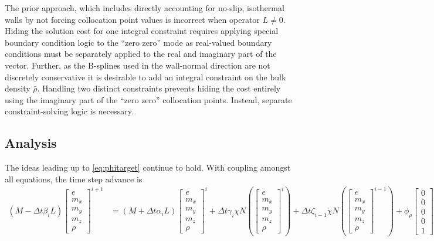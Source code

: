 \documentclass[letterpaper,11pt,nointlimits,reqno]{amsart}
\begin{document}
The prior approach, which includes directly accounting for no-slip, isothermal
walls by not forcing collocation point values is incorrect when operator $L
\neq 0$.  Hiding the solution cost for one integral constraint requires
applying special boundary condition logic to the ``zero zero'' mode as
real-valued boundary conditions must be separately applied to the real and
imaginary part of the vector.  Further, as the B-splines used in the
wall-normal direction are not discretely conservative it is desirable to add an
integral constraint on the bulk density $\bar{\rho}$.  Handling two distinct
constraints prevents hiding the cost entirely using the imaginary part of the
``zero zero'' collocation points.  Instead, separate constraint-solving logic
is necessary.

\subsection{Analysis}

The ideas leading up to \eqref{eq:phitarget} continue to hold.  With coupling
amongst all equations, the time step advance is
\begin{align}
  \left(M - \Delta{}t\beta_{i}L\right)
  \begin{bmatrix} e \\ m_x \\ m_y \\ m_z \\ \rho \end{bmatrix}^{i+1}
  &=
  \left(M + \Delta{}t\alpha_{i}L\right)
  \begin{bmatrix} e \\ m_x \\ m_y \\ m_z \\ \rho \end{bmatrix}^{i}
  + \Delta{}t\gamma_{i}\chi{}N\left(
  \begin{bmatrix} e \\ m_x \\ m_y \\ m_z \\ \rho \end{bmatrix}^{i}
  \right)
  + \Delta{}t\zeta_{i-1}\chi{}N\left(
  \begin{bmatrix} e \\ m_x \\ m_y \\ m_z \\ \rho \end{bmatrix}^{i-1}
  \right)
  + \phi_\rho
  \begin{bmatrix} 0 \\ 0 \\ 0 \\ 0 \\ 1 \end{bmatrix}
  + \phi_{m_x}
  \begin{bmatrix} u \\ 1 \\ 0 \\ 0 \\ 0 \end{bmatrix}
  .
\end{align}
\end{document}
